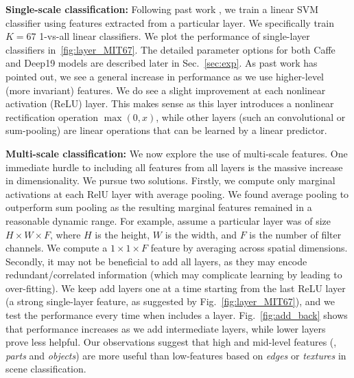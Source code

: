 \documentclass[10pt,twocolumn,letterpaper]{article}
\begin{document}
{\bf Single-scale classification:} Following past work \cite{cnn_baseline}, we train a linear SVM classifier using features extracted from a particular layer. We specifically train $K=67$ 1-vs-all linear classifiers.
We plot the performance of single-layer classifiers in~\ref{fig:layer_MIT67}. The detailed parameter options for both Caffe and Deep19 models are described later in Sec.~\ref{sec:exp}. As past work has pointed out, we see a general increase in performance as we use higher-level (more invariant) features. We do see a slight improvement at each nonlinear activation (ReLU) layer. This makes sense as this layer introduces a nonlinear rectification operation $\max(0,x)$, while other layers (such an convolutional or sum-pooling) are linear operations that can be learned by a linear predictor.


{\bf Multi-scale classification:} We now explore the use of multi-scale features. One immediate hurdle to including all features from all layers is the massive increase in dimensionality. We pursue two solutions. Firstly, we compute only marginal activations at each RelU layer with average pooling. We found average pooling to outperform sum pooling as the resulting marginal features remained in a reasonable dynamic range. For example, assume a particular layer was of size $H \times W \times F$, where $H$ is the height, $W$ is the width, and $F$ is the number of filter channels. We compute a $1 \times 1 \times F$ feature by averaging across spatial dimensions. Secondly, it may not be beneficial to add all layers, as they may encode redundant/correlated information (which may complicate learning by leading to over-fitting). We keep add layers one at a time starting from the last ReLU layer (a strong single-layer feature, as suggested by Fig.~\ref{fig:layer_MIT67}), and we test the performance every time when includes a layer. Fig.~\ref{fig:add_back} shows that performance increases as we add intermediate layers, while lower layers prove less helpful. Our observations suggest that high and mid-level features (\ie, \textit{parts} and \textit{objects}) are more useful than low-features based on \textit{edges} or \textit{textures} in scene classification. 


\end{document}
